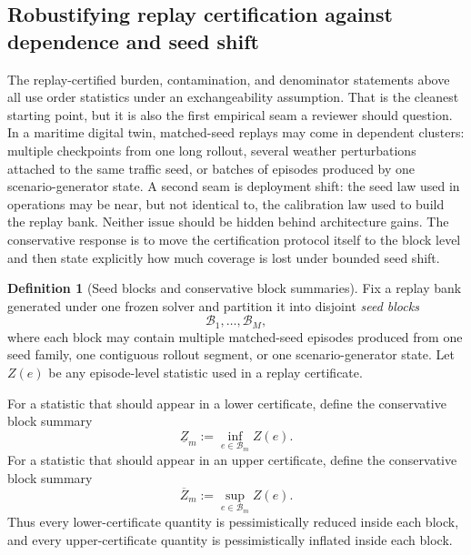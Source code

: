 \documentclass[11pt]{article}
\newcommand{\1}{\mathbf{1}}
\theoremstyle{definition}
\newtheorem{definition}{Definition}[section]
\theoremstyle{plain}
\theoremstyle{remark}
\begin{document}
\subsection{Robustifying replay certification against dependence and seed shift}
\label{supp:subsec:seed-shift-robust}

The replay-certified burden, contamination, and denominator statements above all use order statistics under an exchangeability assumption. That is the cleanest starting point, but it is also the first empirical seam a reviewer should question. In a maritime digital twin, matched-seed replays may come in dependent clusters: multiple checkpoints from one long rollout, several weather perturbations attached to the same traffic seed, or batches of episodes produced by one scenario-generator state. A second seam is deployment shift: the seed law used in operations may be near, but not identical to, the calibration law used to build the replay bank. Neither issue should be hidden behind architecture gains. The conservative response is to move the certification protocol itself to the block level and then state explicitly how much coverage is lost under bounded seed shift.

\begin{definition}[Seed blocks and conservative block summaries]
\label{supp:def:seed-blocks}
Fix a replay bank generated under one frozen solver and partition it into disjoint \emph{seed blocks}
\[
\mathcal B_1,\dots,\mathcal B_M,
\]
where each block may contain multiple matched-seed episodes produced from one seed family, one contiguous rollout segment, or one scenario-generator state. Let $Z(e)$ be any episode-level statistic used in a replay certificate.

For a statistic that should appear in a lower certificate, define the conservative block summary
\[
\underline Z_m := \inf_{e\in \mathcal B_m} Z(e).
\]
For a statistic that should appear in an upper certificate, define the conservative block summary
\[
\overline Z_m := \sup_{e\in \mathcal B_m} Z(e).
\]
Thus every lower-certificate quantity is pessimistically reduced inside each block, and every upper-certificate quantity is pessimistically inflated inside each block.
\end{definition}
\end{document}
